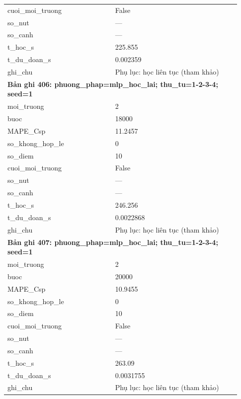 \begin{longtable}{p{0.43\linewidth}p{0.50\linewidth}}
cuoi\_\allowbreak moi\_\allowbreak truong & False \\
so\_\allowbreak nut & — \\
so\_\allowbreak canh & — \\
t\_\allowbreak hoc\_\allowbreak s & 225.855 \\
t\_\allowbreak du\_\allowbreak doan\_\allowbreak s & 0.002359 \\
ghi\_\allowbreak chu & Phụ lục: học liên tục (tham khảo) \\
\midrule
\multicolumn{2}{p{0.95\linewidth}}{\textbf{Bản ghi 406: phuong\_phap=mlp\_hoc\_lai; thu\_tu=1-2-3-4; seed=1}} \\
moi\_\allowbreak truong & 2 \\
buoc & 18000 \\
MAPE\_\allowbreak Csp & 11.2457 \\
so\_\allowbreak khong\_\allowbreak hop\_\allowbreak le & 0 \\
so\_\allowbreak diem & 10 \\
cuoi\_\allowbreak moi\_\allowbreak truong & False \\
so\_\allowbreak nut & — \\
so\_\allowbreak canh & — \\
t\_\allowbreak hoc\_\allowbreak s & 246.256 \\
t\_\allowbreak du\_\allowbreak doan\_\allowbreak s & 0.0022868 \\
ghi\_\allowbreak chu & Phụ lục: học liên tục (tham khảo) \\
\midrule
\multicolumn{2}{p{0.95\linewidth}}{\textbf{Bản ghi 407: phuong\_phap=mlp\_hoc\_lai; thu\_tu=1-2-3-4; seed=1}} \\
moi\_\allowbreak truong & 2 \\
buoc & 20000 \\
MAPE\_\allowbreak Csp & 10.9455 \\
so\_\allowbreak khong\_\allowbreak hop\_\allowbreak le & 0 \\
so\_\allowbreak diem & 10 \\
cuoi\_\allowbreak moi\_\allowbreak truong & False \\
so\_\allowbreak nut & — \\
so\_\allowbreak canh & — \\
t\_\allowbreak hoc\_\allowbreak s & 263.09 \\
t\_\allowbreak du\_\allowbreak doan\_\allowbreak s & 0.0031755 \\
ghi\_\allowbreak chu & Phụ lục: học liên tục (tham khảo) \\

\end{longtable}
